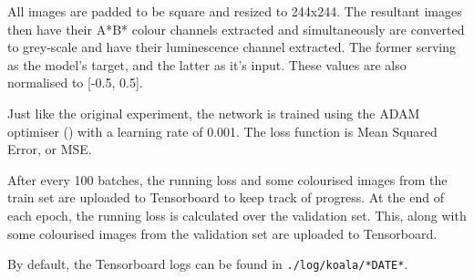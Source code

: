\documentclass{article}
\begin{document}
        All images are padded to be square and resized to 244x244. The resultant images then have their A*B* colour channels extracted and simultaneously are converted to grey-scale and have their luminescence channel extracted. The former serving as the model's target, and the latter as it's input. These values are also normalised to [-0.5, 0.5]. 
        
        Just like the original experiment, the network is trained using the ADAM optimiser (\cite{ADAM}) with a learning rate of 0.001. The loss function is Mean Squared Error, or MSE.
        
        After every 100 batches, the running loss and some colourised images from the train set are uploaded to Tensorboard to keep track of progress. At the end of each epoch, the running loss is calculated over the validation set. This, along with some colourised images from the validation set are uploaded to Tensorboard.
        
        By default, the Tensorboard logs can be found in \texttt{./log/koala/*DATE*}.
        
\end{document}
